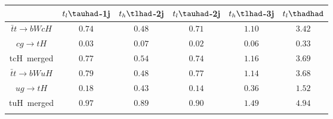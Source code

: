 \centering
\begin{tabular}{cccccc} \toprule\toprule
 & $t_{l}\tauhad$-1j & $t_{h}\tlhad$-2j & $t_{l}\tauhad$-2j & $t_{h}\tlhad$-3j & $t_{l}\thadhad$\\\midrule
$\bar{t}t\to bWcH$ & $0.74$ & $0.48$ & $0.71$ & $1.10$ & $3.42$\\
$cg\to tH$ & $0.03$ & $0.07$ & $0.02$ & $0.06$ & $0.33$\\
tcH~merged & $0.77$ & $0.54$ & $0.74$ & $1.16$ & $3.69$\\
$\bar{t}t\to bWuH$ & $0.79$ & $0.48$ & $0.77$ & $1.14$ & $3.68$\\
$ug\to tH$ & $0.18$ & $0.43$ & $0.14$ & $0.36$ & $1.52$\\
tuH~merged & $0.97$ & $0.89$ & $0.90$ & $1.49$ & $4.94$\\
\bottomrule\bottomrule\\
\end{tabular}
